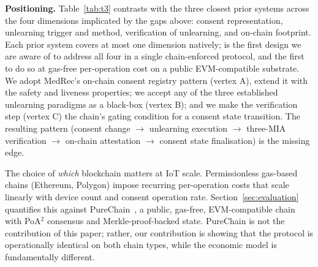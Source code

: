 \smallskip
\noindent\textbf{Positioning.}
Table~\ref{tab:t3} contrasts \sysname with the three closest prior
systems across the four dimensions implicated by the gaps above:
consent representation, unlearning trigger and method, verification
of unlearning, and on-chain footprint. Each prior system covers at
most one dimension natively; \sysname is the first design we are
aware of to address all four in a single chain-enforced protocol,
and the first to do so at gas-free per-operation cost on a public
EVM-compatible substrate. We adopt MedRec's on-chain consent
registry pattern (vertex A), extend it with the \clsm safety and
liveness properties; we accept any of the three established
unlearning paradigms as a black-box (vertex B); and we make the
verification step (vertex C) the chain's gating condition for a
consent state transition. The resulting pattern (consent change
$\rightarrow$ unlearning execution $\rightarrow$ three-MIA
verification $\rightarrow$ on-chain attestation $\rightarrow$
consent state finalisation) is the missing edge.

The choice of \emph{which} blockchain matters at IoT scale.
Permissionless gas-based chains (Ethereum, Polygon) impose recurring
per-operation costs that scale linearly with device count and consent
operation rate. Section~\ref{sec:evaluation} quantifies this against
PureChain~\cite{kim2025purechain}, a public, gas-free,
EVM-compatible chain with PoA$^2$ consensus and
Merkle-proof-backed state. PureChain is not the
contribution of this paper; rather, our contribution is showing that
the protocol is operationally identical on both chain types, while
the economic model is fundamentally different.
